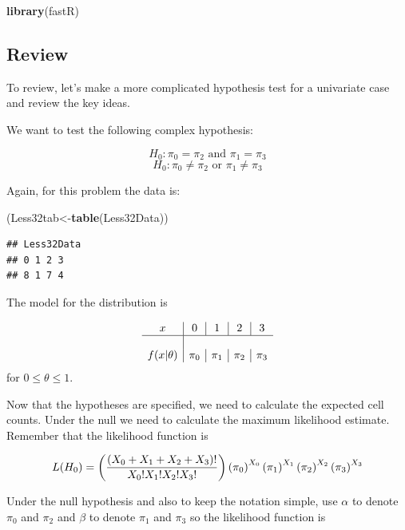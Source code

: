 \documentclass[]{book}
\newenvironment{Shaded}{\begin{snugshade}}{\end{snugshade}}
\newcommand{\KeywordTok}[1]{\textcolor[rgb]{0.13,0.29,0.53}{\textbf{#1}}}
\newcommand{\NormalTok}[1]{#1}
\theoremstyle{definition}
\theoremstyle{definition}
\theoremstyle{definition}
\theoremstyle{remark}
\begin{document}
\begin{Shaded}
\begin{Highlighting}[]
\KeywordTok{library}\NormalTok{(fastR)}
\end{Highlighting}
\end{Shaded}

\subsection{Review}\label{review-7}

To review, let's make a more complicated hypothesis test for a
univariate case and review the key ideas.

We want to test the following complex hypothesis:

\[H_{0}: \pi_{0}=\pi_{2} \mbox{ and } \pi_{1}=\pi_{3}\]
\[H_{0}: \pi_{0}\neq \pi_{2} \mbox{ or } \pi_{1}\neq \pi_{3}\]

Again, for this problem the data is:

\begin{Shaded}
\begin{Highlighting}[]
\NormalTok{(Less32tab<-}\KeywordTok{table}\NormalTok{(Less32Data))}
\end{Highlighting}
\end{Shaded}

\begin{verbatim}
## Less32Data
## 0 1 2 3 
## 8 1 7 4
\end{verbatim}

The model for the distribution is

\[
\begin{array}{c|c|c|c|c} 
x & 0 & 1 & 2 & 3 \\ \hline \\ f(x|\theta) & \pi_{0} & \pi_{1} & \pi_{2} & \pi_{3}
\end{array} 
\] for \(0 \leq \theta \leq 1\).

Now that the hypotheses are specified, we need to calculate the expected
cell counts. Under the null we need to calculate the maximum likelihood
estimate. Remember that the likelihood function is

\[L(H_{0})= \left( {\left(X_{0}+X_{1}+X_{2}+X_{3} \right)! \over X_{0}!X_{1}!X_{2}!X_{3}!} \right) \left( \pi_{0} \right)^{X_{0}} \left( \pi_{1} \right)^{X_{1}}\left( \pi_{2} \right)^{X_{2}}\left( \pi_{3} \right)^{X_{3}}\]

Under the null hypothesis and also to keep the notation simple, use
\(\alpha\) to denote \(\pi_{0}\) and \(\pi_{2}\) and \(\beta\) to denote
\(\pi_{1}\) and \(\pi_{3}\) so the likelihood function is
\end{document}
